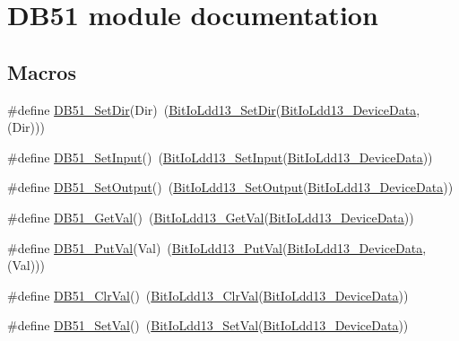 \hypertarget{group___d_b51__module}{}\section{D\+B51 module documentation}
\label{group___d_b51__module}
\subsection*{Macros}
\begin{DoxyCompactItemize}
\item 
\#define \hyperlink{group___d_b51__module_ga6c9f2f688f7237c92652bf2acdba1534}{D\+B51\+\_\+\+Set\+Dir}(Dir)~(\hyperlink{group___bit_io_ldd13__module_gaa510bc6987ce93bf7a866b1766f1a382}{Bit\+Io\+Ldd13\+\_\+\+Set\+Dir}(\hyperlink{group___bit_io_ldd13__module_gaced3b535c8325a9d8bcaa5fcc7de35d7}{Bit\+Io\+Ldd13\+\_\+\+Device\+Data}, (Dir)))
\item 
\#define \hyperlink{group___d_b51__module_gafa57a93e4b8c61f7989927f08c0046e9}{D\+B51\+\_\+\+Set\+Input}()~(\hyperlink{group___bit_io_ldd13__module_gac89f06fe1f95f685923b6f13ab290526}{Bit\+Io\+Ldd13\+\_\+\+Set\+Input}(\hyperlink{group___bit_io_ldd13__module_gaced3b535c8325a9d8bcaa5fcc7de35d7}{Bit\+Io\+Ldd13\+\_\+\+Device\+Data}))
\item 
\#define \hyperlink{group___d_b51__module_gaf8769995a5d01a13892266b0a8203541}{D\+B51\+\_\+\+Set\+Output}()~(\hyperlink{group___bit_io_ldd13__module_ga093dde10b8ace24f9342126bad933a77}{Bit\+Io\+Ldd13\+\_\+\+Set\+Output}(\hyperlink{group___bit_io_ldd13__module_gaced3b535c8325a9d8bcaa5fcc7de35d7}{Bit\+Io\+Ldd13\+\_\+\+Device\+Data}))
\item 
\#define \hyperlink{group___d_b51__module_gabb1304245b180d3df1948b6bdbec3715}{D\+B51\+\_\+\+Get\+Val}()~(\hyperlink{group___bit_io_ldd13__module_ga91a8447c1b3c4ab44bfa626ee06b0175}{Bit\+Io\+Ldd13\+\_\+\+Get\+Val}(\hyperlink{group___bit_io_ldd13__module_gaced3b535c8325a9d8bcaa5fcc7de35d7}{Bit\+Io\+Ldd13\+\_\+\+Device\+Data}))
\item 
\#define \hyperlink{group___d_b51__module_ga56c7e70e1c7498ab9e55563d4889b20c}{D\+B51\+\_\+\+Put\+Val}(Val)~(\hyperlink{group___bit_io_ldd13__module_ga9e36ef0c8392418090d73328ba1b1d72}{Bit\+Io\+Ldd13\+\_\+\+Put\+Val}(\hyperlink{group___bit_io_ldd13__module_gaced3b535c8325a9d8bcaa5fcc7de35d7}{Bit\+Io\+Ldd13\+\_\+\+Device\+Data}, (Val)))
\item 
\#define \hyperlink{group___d_b51__module_ga822f0a01eebbe6b6c65b553f07031645}{D\+B51\+\_\+\+Clr\+Val}()~(\hyperlink{group___bit_io_ldd13__module_gad416cb8b9b15c2afb948ef359da7140d}{Bit\+Io\+Ldd13\+\_\+\+Clr\+Val}(\hyperlink{group___bit_io_ldd13__module_gaced3b535c8325a9d8bcaa5fcc7de35d7}{Bit\+Io\+Ldd13\+\_\+\+Device\+Data}))
\item 
\#define \hyperlink{group___d_b51__module_ga28989533400998062d341d24b4f779e3}{D\+B51\+\_\+\+Set\+Val}()~(\hyperlink{group___bit_io_ldd13__module_ga6525bcbb0341b742d9180be475410ac1}{Bit\+Io\+Ldd13\+\_\+\+Set\+Val}(\hyperlink{group___bit_io_ldd13__module_gaced3b535c8325a9d8bcaa5fcc7de35d7}{Bit\+Io\+Ldd13\+\_\+\+Device\+Data}))
\end{DoxyCompactItemize}


